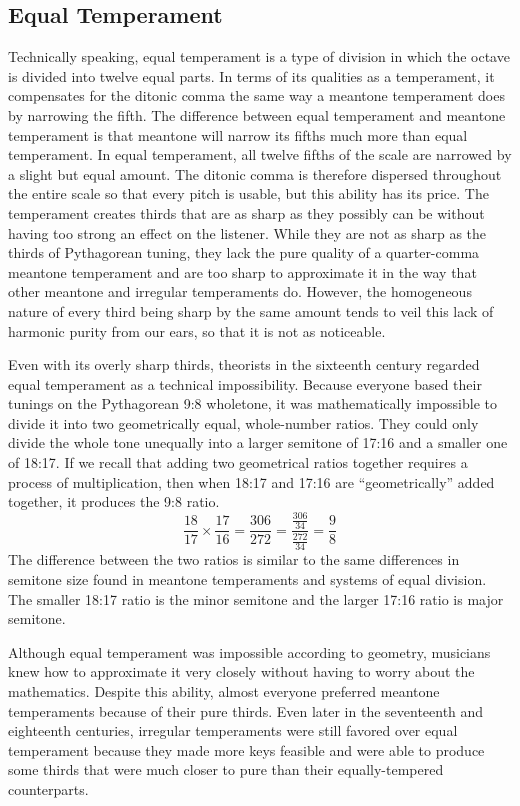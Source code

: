 \subsection{Equal Temperament}

Technically speaking, equal temperament is a type of division in which the octave is
divided into twelve equal parts.  In terms of its qualities as a temperament, it
compensates for the ditonic comma the same way a meantone temperament does by narrowing
the fifth. The difference between equal temperament and meantone temperament is that
meantone will narrow its fifths much more than equal temperament.  In equal
temperament, all twelve fifths of the scale are narrowed by a slight but equal amount.
The ditonic comma is therefore dispersed throughout the entire scale so that every
pitch is usable, but this ability has its price.  The temperament creates thirds that
are as sharp as they possibly can be without having too strong an effect on the
listener.  While they are not as sharp as the thirds of Pythagorean tuning, they lack
the pure quality of a quarter-comma meantone temperament and are too sharp to
approximate it in the way that other meantone and irregular temperaments do. However,
the homogeneous nature of every third being sharp by the same amount tends to veil this
lack of harmonic purity from our ears, so that it is not as noticeable.

Even with its overly sharp thirds, theorists in the sixteenth century regarded equal
temperament as a technical impossibility. Because everyone based their tunings on the
Pythagorean 9:8 wholetone, it was mathematically impossible to divide it into two
geometrically equal, whole-number ratios. They could only divide the whole tone
unequally into a larger semitone of 17:16 and a smaller one of 18:17.
\autocite[20]{ML:1} If we recall that adding two geometrical ratios together requires a
process of multiplication, then when 18:17 and 17:16 are ``geometrically'' added
together, it produces the 9:8 ratio.
\begin{equation}
  \frac{18}{17} \times
  \frac{17}{16} =
  \frac{306}{272} =
  \frac{\frac{306}{34}}{\frac{272}{34}} =
  \frac{9}{8}
\end{equation}
The difference between the two ratios is similar to the same differences in semitone size
found in meantone temperaments and systems of equal division.  The smaller 18:17 ratio is
the minor semitone and the larger 17:16 ratio is major semitone.

Although equal temperament was impossible according to geometry, musicians knew
how to approximate it very closely without having to worry about the mathematics.
Despite this ability, almost everyone preferred meantone temperaments because of
their pure thirds. Even later in the seventeenth and eighteenth centuries,
irregular temperaments were still favored over equal temperament because they
made more keys feasible and were able to produce some thirds that were much
closer to pure than their equally-tempered counterparts.

